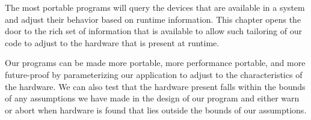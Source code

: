 
The most portable programs will query the devices that are available in a system and adjust their behavior based on runtime information. This chapter opens the door to the rich set of information that is available to allow such tailoring of our code to adjust to the hardware that is present at runtime.\par

Our programs can be made more portable, more performance portable, and more future-proof by parameterizing our application to adjust to the characteristics of the hardware. We can also test that the hardware present falls within the bounds of any assumptions we have made in the design of our program and either warn or abort when hardware is found that lies outside the bounds of our assumptions.\par




\newpage